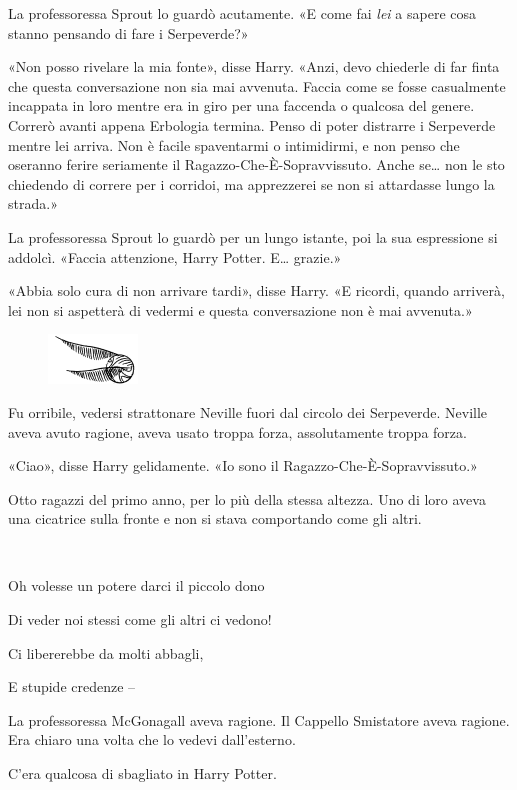 La professoressa Sprout lo guardò acutamente. «E come fai \textit{lei} a sapere cosa stanno pensando di fare i Serpeverde?»

«Non posso rivelare la mia fonte», disse Harry. «Anzi, devo chiederle di far finta che questa conversazione non sia mai avvenuta. Faccia come se fosse casualmente incappata in loro mentre era in giro per una faccenda o qualcosa del genere. Correrò avanti appena Erbologia termina. Penso di poter distrarre i Serpeverde mentre lei arriva. Non è facile spaventarmi o intimidirmi, e non penso che oseranno ferire seriamente il Ragazzo-Che-È-Sopravvissuto. Anche se… non le sto chiedendo di correre per i corridoi, ma apprezzerei se non si attardasse lungo la strada.»

La professoressa Sprout lo guardò per un lungo istante, poi la sua espressione si addolcì. «Faccia attenzione, Harry Potter. E… grazie.»

«Abbia solo cura di non arrivare tardi», disse Harry. «E ricordi, quando arriverà, lei non si aspetterà di vedermi e questa conversazione non è mai avvenuta.»

\begin{figure}[h!]
        \includegraphics[scale=0.4]{boccino.png}
        \centering
\end{figure}

Fu orribile, vedersi strattonare Neville fuori dal circolo dei Serpeverde. Neville aveva avuto ragione, aveva usato troppa forza, assolutamente troppa forza.

«Ciao», disse Harry gelidamente. «Io sono il Ragazzo-Che-È-Sopravvissuto.»

Otto ragazzi del primo anno, per lo più della stessa altezza. Uno di loro aveva una cicatrice sulla fronte e non si stava comportando come gli altri.

\vspace{1em}
\begin{addmargin}[3em]{3em}%
\begin{itpars}
~

Oh volesse un potere darci il piccolo dono

Di veder noi stessi come gli altri ci vedono!

Ci libererebbe da molti abbagli,

E stupide credenze –
\end{itpars}
\end{addmargin}
\vspace{1em}

La professoressa McGonagall aveva ragione. Il Cappello Smistatore aveva ragione. Era chiaro una volta che lo vedevi dall’esterno.

C’era qualcosa di sbagliato in Harry Potter.



